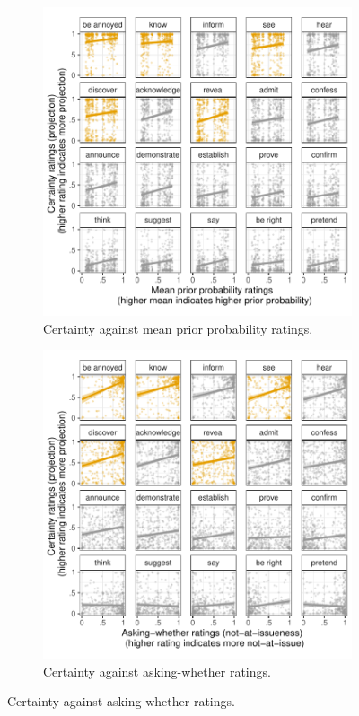 \documentclass[11pt,fleqn]{article}
\newcommand{\6}{\mbox{$[\hspace*{-.6mm}[$}}
\newcommand{\9}{\mbox{$]\hspace*{-.6mm}]$}}
\begin{document}
\begin{figure}[h!]
\centering
\begin{subfigure}[t]{0.49\textwidth}
\centering
\includegraphics[width=\textwidth]{../../results/exp2/graphs/projection-by-prior}
\caption{Certainty against mean prior probability ratings.}\label{fig:certainty-by-priorExp2}
\end{subfigure} \hfill \begin{subfigure}[t]{0.49\textwidth}
\centering
\includegraphics[width=\textwidth]{../../results/exp2/graphs/projection-by-ai}
\caption{Certainty against asking-whether ratings.}\label{fig:certainty-by-naiExp2}
 \end{subfigure}
 

\end{figure}
\end{document}
